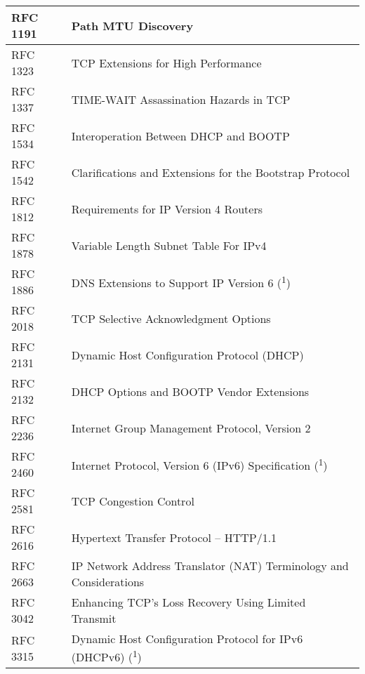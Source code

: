 \begin{longtable}{ | l | p{15cm} | }
RFC 1191 &
Path MTU Discovery \\ \hline

RFC 1323 &
TCP Extensions for High Performance \\ \hline

RFC 1337 &
TIME-WAIT Assassination Hazards in TCP \\ \hline

RFC 1534 &
Interoperation Between DHCP and BOOTP \\ \hline

RFC 1542 &
Clarifications and Extensions for the Bootstrap Protocol \\ \hline

RFC 1812 &
Requirements for IP Version 4 Routers \\ \hline

RFC 1878 &
Variable Length Subnet Table For IPv4 \\ \hline

RFC 1886 &
DNS Extensions to Support IP Version 6 (\textsuperscript{1}) \\ \hline

RFC 2018 &
TCP Selective Acknowledgment Options \\ \hline

RFC 2131 &
Dynamic Host Configuration Protocol (DHCP) \\ \hline

RFC 2132 &
DHCP Options and BOOTP Vendor Extensions \\ \hline

RFC 2236 &
Internet Group Management Protocol, Version 2 \\ \hline

RFC 2460 &
Internet Protocol, Version 6 (IPv6) Specification (\textsuperscript{1}) \\ \hline

RFC 2581 &
TCP Congestion Control \\ \hline

RFC 2616 &
Hypertext Transfer Protocol -- HTTP/1.1 \\ \hline

RFC 2663 &
IP Network Address Translator (NAT) Terminology and Considerations \\ \hline

RFC 3042 &
Enhancing TCP's Loss Recovery Using Limited Transmit \\ \hline

RFC 3315 &
Dynamic Host Configuration Protocol for IPv6 (DHCPv6) (\textsuperscript{1}) \\ \hline


\end{longtable}

